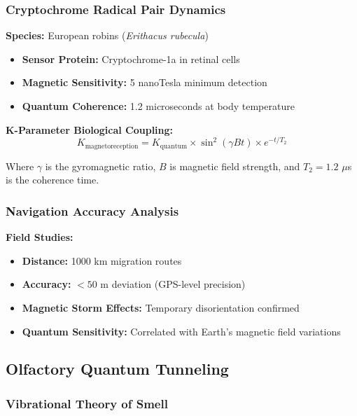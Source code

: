 \documentclass[11pt,a4paper,twoside]{article}
\begin{document}
\subsubsection{Cryptochrome Radical Pair Dynamics}

\textbf{Species:} European robins (\textit{Erithacus rubecula})
\begin{itemize}[leftmargin=*]
    \item \textbf{Sensor Protein:} Cryptochrome-1a in retinal cells
    \item \textbf{Magnetic Sensitivity:} 5 nanoTesla minimum detection
    \item \textbf{Quantum Coherence:} 1.2 microseconds at body temperature
\end{itemize}

\textbf{K-Parameter Biological Coupling:}
\begin{equation}
K_{\text{magnetoreception}} = K_{\text{quantum}} \times \sin^2(\gamma B t) \times e^{-t/T_2}
\end{equation}

Where $\gamma$ is the gyromagnetic ratio, $B$ is magnetic field strength, and $T_2 = 1.2$ $\mu$s is the coherence time.

\subsubsection{Navigation Accuracy Analysis}

\textbf{Field Studies:}
\begin{itemize}[leftmargin=*]
    \item \textbf{Distance:} 1000 km migration routes
    \item \textbf{Accuracy:} $<50$ m deviation (GPS-level precision)
    \item \textbf{Magnetic Storm Effects:} Temporary disorientation confirmed
    \item \textbf{Quantum Sensitivity:} Correlated with Earth's magnetic field variations
\end{itemize}

\subsection{Olfactory Quantum Tunneling}

\subsubsection{Vibrational Theory of Smell}
\end{document}
